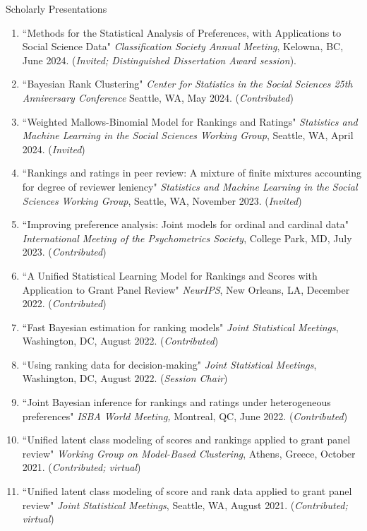 \documentclass{resume} %
\begin{document}
\begin{rSection}{Scholarly Presentations}
\begin{enumerate}
\item ``Methods for the Statistical Analysis of Preferences, with Applications to Social Science Data" \textit{Classification Society Annual Meeting}, Kelowna, BC, June 2024. (\textit{Invited; Distinguished Dissertation Award session}).
\item ``Bayesian Rank Clustering" \textit{Center for Statistics in the Social Sciences 25th Anniversary Conference} Seattle, WA, May 2024. (\textit{Contributed})
\item ``Weighted Mallows-Binomial Model for Rankings and Ratings" \textit{Statistics and Machine Learning in the Social Sciences Working Group}, Seattle, WA, April 2024. (\textit{Invited})
\item ``Rankings and ratings in peer review: A mixture of finite mixtures accounting for degree of reviewer leniency" \textit{Statistics and Machine Learning in the Social Sciences Working Group}, Seattle, WA, November 2023. (\textit{Invited})
\item ``Improving preference analysis: Joint models for ordinal and cardinal data" \textit{International Meeting of the Psychometrics Society}, College Park, MD, July 2023. (\textit{Contributed})
\item ``A Unified Statistical Learning Model for Rankings and Scores with Application to Grant Panel Review" \textit{NeurIPS}, New Orleans, LA, December 2022. (\textit{Contributed})
\item ``Fast Bayesian estimation for ranking models" \textit{Joint Statistical Meetings}, Washington, DC, August 2022. (\textit{Contributed})
\item ``Using ranking data for decision-making" \textit{Joint Statistical Meetings}, Washington, DC, August 2022. (\textit{Session Chair})
\item ``Joint Bayesian inference for rankings and ratings under heterogeneous preferences" \textit{ISBA World Meeting,} Montreal, QC, June 2022. (\textit{Contributed})
\item ``Unified latent class modeling of scores and rankings applied to grant panel review" \textit{Working Group on Model-Based Clustering}, Athens, Greece, October 2021. (\textit{Contributed; virtual})
\item ``Unified latent class modeling of score and rank data applied to grant panel review" \textit{Joint Statistical Meetings}, Seattle, WA, August 2021. (\textit{Contributed; virtual})
\end{enumerate}

\end{rSection}
\end{document}
